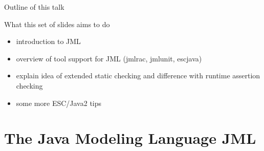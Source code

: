 \documentclass[
pdf,
nocolorBG,
slideColor,
erik,
]{prosper}
\title{\embf{\blue 
       {\huge Introduction to JML
      }}}
\author{\embf{\Large{\red Erik Poll}}
       }
\newif\ifignore
\begin{document}
\maketitle 

\boldmath

\ifignore
\begin{slide}{Test \hfill}

{\Large Large}
{\large large}
{\normalsize normal}
niks
{\small small}
{\footnotesize footnote}
{\scriptsize script}
{\tiny tiny}

{\bf bf}
{\rm rm}
{\it it}
{\sf sf}
{\sc sc}

\textit{textit}
\textrm{textrm}
\textbf{textbf}
\textsf{textsf}
\textsc{textsc}

\end{slide}
\fi


\begin{slide}{Outline of this talk}
\vspace*{-2ex}

What this set of slides aims to do
\begin{itemize}
\item introduction to JML
\item overview of tool support for JML (jmlrac, jmlunit, escjava)
\item explain idea of extended static checking and difference with runtime assertion checking
\item some more ESC/Java2 tips
\end{itemize}


\end{slide}


\part{{\Large \red The Java Modeling Language JML}}
\end{document}
